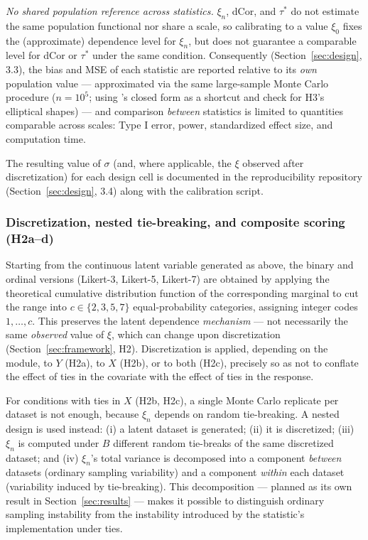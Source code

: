\documentclass[article]{ajs}
\begin{document}
\emph{No shared population reference across statistics.} $\xi_n$,
dCor, and $\tau^\ast$ do not estimate the same population functional
nor share a scale, so calibrating to a value $\xi_0$ fixes the
(approximate) dependence level for $\xi_n$, but does not guarantee a
comparable level for dCor or $\tau^\ast$ under the same condition.
Consequently (Section~\ref{sec:design}, 3.3), the bias and MSE of each
statistic are reported relative to its \emph{own} population value ---
approximated via the same large-sample Monte Carlo procedure
($n=10^5$; using \citet{ansari2026}'s closed form as a shortcut and
check for H3's elliptical shapes) --- and comparison \emph{between}
statistics is limited to quantities comparable across scales: Type I
error, power, standardized effect size, and computation time.

The resulting value of $\sigma$ (and, where applicable, the $\xi$
observed after discretization) for each design cell is documented in
the reproducibility repository (Section~\ref{sec:design}, 3.4) along
with the calibration script.

\subsubsection{Discretization, nested tie-breaking, and composite scoring (H2a--d)}

Starting from the continuous latent variable generated as above, the
binary and ordinal versions (Likert-3, Likert-5, Likert-7) are obtained
by applying the theoretical cumulative distribution function of the
corresponding marginal to cut the range into $c \in \{2,3,5,7\}$
equal-probability categories, assigning integer codes $1,\dots,c$.
This preserves the latent dependence \emph{mechanism} --- not
necessarily the same \emph{observed} value of $\xi$, which can change
upon discretization (Section~\ref{sec:framework}, H2). Discretization
is applied, depending on the module, to $Y$ (H2a), to $X$ (H2b), or to
both (H2c), precisely so as not to conflate the effect of ties in the
covariate with the effect of ties in the response.

For conditions with ties in $X$ (H2b, H2c), a single Monte Carlo
replicate per dataset is not enough, because $\xi_n$ depends on random
tie-breaking. A nested design is used instead: (i) a latent dataset is
generated; (ii) it is discretized; (iii) $\xi_n$ is computed under $B$
different random tie-breaks of the same discretized dataset; and (iv)
$\xi_n$'s total variance is decomposed into a component \emph{between}
datasets (ordinary sampling variability) and a component \emph{within}
each dataset (variability induced by tie-breaking). This decomposition
--- planned as its own result in Section~\ref{sec:results} --- makes
it possible to distinguish ordinary sampling instability from the
instability introduced by the statistic's implementation under ties.
\end{document}
